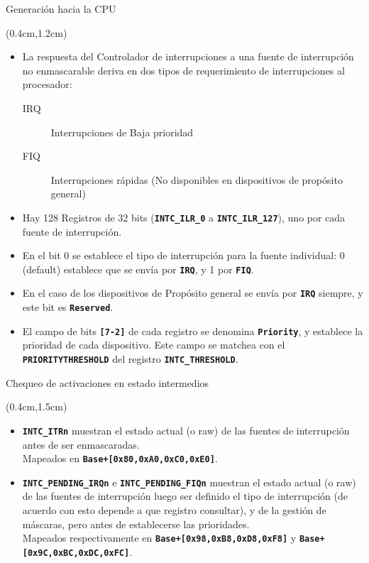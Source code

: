 \documentclass[usenames,table,xcolor={x11names},aspectratio=169]{beamer}
\begin{document}
    
\begin{frame}[t]{Generación hacia la CPU}
 \begin{textblock*}{\textwidth}(0.4cm,1.2cm)
  \begin{itemize}[<+(1)->]\justifying %
   \item La respuesta del Controlador de interrupciones a una fuente de interrupción no enmascarable deriva en dos tipos de requerimiento de interrupciones al procesador:
   \begin{description}
    \item[IRQ] Interrupciones de Baja prioridad
    \item[FIQ] Interrupciones rápidas (No disponibles en dispositivos de propósito general)
   \end{description}
   \item Hay 128 Registros de 32 bits (\texttt{\textbf{INTC\_ILR\_0}} a \texttt{\textbf{INTC\_ILR\_127}}), uno por cada fuente de interrupción.
   \item En el bit 0 se establece el tipo de interrupción para la fuente individual: 0 (default) establece que se envía por \textbf{\texttt{IRQ}}, y 1 por \texttt{\textbf{FIQ}}. 
   \item En el caso de los dispositivos de Propósito general se envía por \textbf{\texttt{IRQ}} siempre, y este bit es \texttt{\textbf{Reserved}}.
   \item El campo de bits \texttt{\textbf{[7-2]}} de cada registro se denomina \texttt{\textbf{Priority}}, y establece la prioridad de cada dispositivo. Este campo se matchea con el \texttt{\textbf{PRIORITYTHRESHOLD}} del registro \texttt{\textbf{INTC\_THRESHOLD}}.
  \end{itemize}
 \end{textblock*}
\end{frame}

\begin{frame}[t]{Chequeo de activaciones en estado intermedios}
 \begin{textblock*}{\textwidth}(0.4cm,1.5cm)
  \begin{itemize}[<+(1)->]\justifying \parskip 0.2cm
   \item \texttt{\textbf{INTC\_ITRn}} muestran el estado actual (o raw) de las fuentes de interrupción antes de ser enmascaradas.\\
   Mapeados en \texttt{\textbf{Base+[0x80,0xA0,0xC0,0xE0]}}.
   \item \texttt{\textbf{INTC\_PENDING\_IRQn}} e \texttt{\textbf{INTC\_PENDING\_FIQn}} muestran el estado actual (o raw) de las fuentes de interrupción luego ser definido el tipo de interrupción (de acuerdo con esto depende a que registro consultar), y de la gestión de máscaras, pero antes de establecerse las prioridades.\\
   Mapeados respectivamente en \texttt{\textbf{Base+[0x98,0xB8,0xD8,0xF8]}} y \texttt{\textbf{Base+[0x9C,0xBC,0xDC,0xFC]}}.
  \end{itemize}
 \end{textblock*}
\end{frame}
\end{document}
